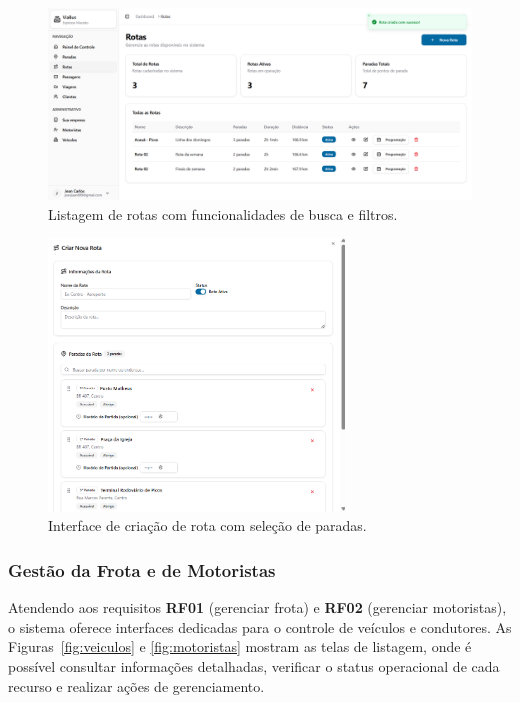 \begin{figure}[H]
  \centering
  \includegraphics[width=1\textwidth]{imagens/tela-rotas.png}
  \caption{Listagem de rotas com funcionalidades de busca e filtros.}
  \label{fig:tela-rotas}
\end{figure}

\begin{figure}[H]
  \centering
  \includegraphics[width=0.7\textwidth]{imagens/criacao-rota.png}
  \caption{Interface de criação de rota com seleção de paradas.}
  \label{fig:criacao-rota}
\end{figure}

\subsubsection{Gestão da Frota e de Motoristas}
Atendendo aos requisitos \textbf{RF01} (gerenciar frota) e \textbf{RF02} (gerenciar motoristas), o sistema oferece interfaces dedicadas para o controle de veículos e condutores. As Figuras~\ref{fig:veiculos} e \ref{fig:motoristas} mostram as telas de listagem, onde é possível consultar informações detalhadas, verificar o status operacional de cada recurso e realizar ações de gerenciamento.

